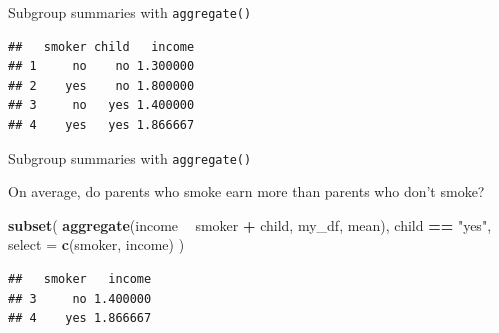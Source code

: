 \documentclass[ignorenonframetext,]{beamer}
\newenvironment{Shaded}{\begin{snugshade}}{\end{snugshade}}
\newcommand{\DataTypeTok}[1]{\textcolor[rgb]{0.13,0.29,0.53}{#1}}
\newcommand{\KeywordTok}[1]{\textcolor[rgb]{0.13,0.29,0.53}{\textbf{#1}}}
\newcommand{\NormalTok}[1]{#1}
\newcommand{\OperatorTok}[1]{\textcolor[rgb]{0.81,0.36,0.00}{\textbf{#1}}}
\newcommand{\StringTok}[1]{\textcolor[rgb]{0.31,0.60,0.02}{#1}}
\begin{document}
\begin{frame}[fragile]{Subgroup summaries with \texttt{aggregate()}}
\protect\hypertarget{subgroup-summaries-with-aggregate-20}{}

\begin{Shaded}
\end{Shaded}

\begin{verbatim}
##   smoker child   income
## 1     no    no 1.300000
## 2    yes    no 1.800000
## 3     no   yes 1.400000
## 4    yes   yes 1.866667
\end{verbatim}

\end{frame}

\begin{frame}[fragile]{Subgroup summaries with \texttt{aggregate()}}
\protect\hypertarget{subgroup-summaries-with-aggregate-21}{}

On average, do parents who smoke earn more than parents who don't smoke?

\begin{Shaded}
\begin{Highlighting}[]
\KeywordTok{subset}\NormalTok{(}
  \KeywordTok{aggregate}\NormalTok{(income }\OperatorTok{~}\StringTok{ }\NormalTok{smoker }\OperatorTok{+}\StringTok{ }\NormalTok{child, my_df, mean),}
\NormalTok{  child }\OperatorTok{==}\StringTok{ "yes"}\NormalTok{,}
  \DataTypeTok{select =} \KeywordTok{c}\NormalTok{(smoker, income)}
\NormalTok{  )}
\end{Highlighting}
\end{Shaded}

\begin{verbatim}
##   smoker   income
## 3     no 1.400000
## 4    yes 1.866667
\end{verbatim}

\end{frame}
\end{document}
